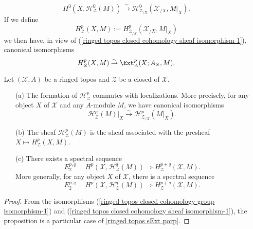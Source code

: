 \begin{equation}\label{ringed topos closed cohomology localization-1}
H^0(X,\mathcal{H}_\mathcal{Z}^0(M)) \stackrel{\sim}{\to } \mathcal{H}^0_{\mathcal{Z}_{/X}}(\mathcal{X}_{/X},M|_X).
\end{equation}
If we define
\begin{equation}\label{ringed topos closed cohomology group on X-1}
H^p_\mathcal{Z}(X,M):=H^p_{\mathcal{Z}_{/X}}(\mathcal{X}_{/X},M|_X)
\end{equation}
we then have, in view of (\ref{ringed topos closed cohomology sheaf isomorphism-1}), canonical isomorphisms
\begin{equation}\label{ringed topos closed cohomology group on X-2}
H^p_\mathcal{Z}(X,M) \stackrel{\sim}{\to } \Ext_A^p(X;A_\mathcal{Z},M).
\end{equation}

\begin{proposition}\label{ringed topos closed cohomology prop}
Let $(\mathcal{X},A)$ be a ringed topos and $\mathcal{Z}$ be a closed of $\mathcal{X}$.
\begin{enumerate}
    \item[(a)] The formation of $\mathcal{H}_\mathcal{Z}^p$ commutes with localizations. More precisely, for any object $X$ of $\mathcal{X}$ and any $A$-module $M$, we have canonical isomorphisms
    \begin{equation}\label{ringed topos closed cohomology prop-1}
    \mathcal{H}^p_\mathcal{Z}(M)|_X \stackrel{\sim}{\to } \mathcal{H}^p_{\mathcal{Z}_{/X}}(M|_X).
    \end{equation}
    \item[(b)] The sheaf $\mathcal{H}^p_\mathcal{Z}(M)$ is the sheaf associated with the presheaf $X\mapsto H^p_\mathcal{Z}(X,M)$.
    \item[(c)] There exists a spectral sequence
    \begin{equation}\label{ringed topos closed cohomology prop-2}
        E_2^{p,q}=H^p(\mathcal{X},\mathcal{H}^q_{\mathcal{Z}}(M))\Rightarrow H^{p+q}_\mathcal{Z}(\mathcal{X},M).
    \end{equation}
    More generally, for any object $X$ of $\mathcal{X}$, there is a spectral sequence
    \begin{equation}\label{ringed topos closed cohomology prop-3}
        E_2^{p,q}=H^p(\mathcal{X},\mathcal{H}^q_{\mathcal{Z}}(M))\Rightarrow H^{p+q}_\mathcal{Z}(\mathcal{X},M).
    \end{equation}
\end{enumerate}
\end{proposition}
\begin{proof}
From the isomorphisms (\ref{ringed topos closed cohomology group isomorphism-1}) and (\ref{ringed topos closed cohomology sheaf isomorphism-1}), the proposition is a particular case of \cref{ringed topos sExt porp}.
\end{proof}

